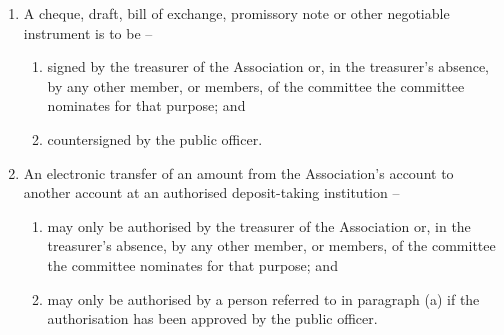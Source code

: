 \documentclass[a4paper,11pt]{article}
\begin{document}
\begin{enumerate}
	\item A cheque, draft, bill of exchange, promissory note or other negotiable instrument is to be --
	\begin{enumerate}
		\item signed by the treasurer of the Association or, in the treasurer's absence, by any other member, or members, of the committee the committee nominates for that purpose; and
		\item countersigned by the public officer.
	\end{enumerate}
	
	\item An electronic transfer of an amount from the Association's account to another account at an authorised deposit-taking institution --
	\begin{enumerate}
		\item may only be authorised by the treasurer of the Association or, in the treasurer's absence, by any other member, or members, of the committee the committee nominates for that purpose; and
		\item may only be authorised by a person referred to in paragraph (a) if the authorisation has been approved by the public officer.
	\end{enumerate}
\end{enumerate}
\end{document}
